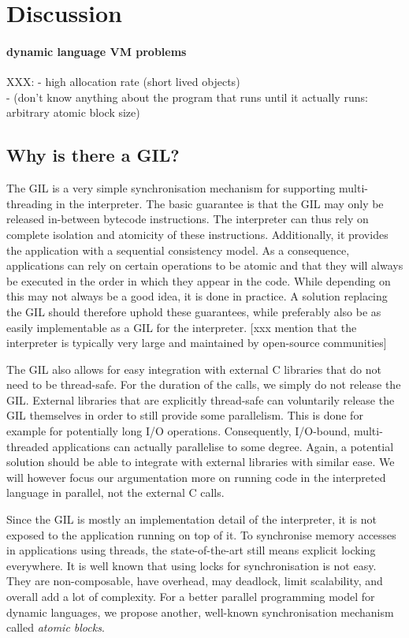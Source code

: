 \documentclass{sigplanconf}
\begin{document}
\section{Discussion}

\paragraph{dynamic language VM problems}
XXX:
- high allocation rate (short lived objects)\\
- (don't know anything about the program that runs until it actually runs: arbitrary atomic block size)


\subsection{Why is there a GIL?}
The GIL is a very simple synchronisation mechanism for supporting
multi-threading in the interpreter. The basic guarantee is that the
GIL may only be released in-between bytecode instructions. The
interpreter can thus rely on complete isolation and atomicity of these
instructions. Additionally, it provides the application with a
sequential consistency model. As a consequence, applications can rely
on certain operations to be atomic and that they will always be
executed in the order in which they appear in the code. While
depending on this may not always be a good idea, it is done in
practice. A solution replacing the GIL should therefore uphold these
guarantees, while preferably also be as easily implementable as a GIL
for the interpreter.
[xxx mention that the interpreter is typically very large and maintained
by open-source communities]

The GIL also allows for easy integration with external C libraries that
do not need to be thread-safe. For the duration of the calls, we
simply do not release the GIL. External libraries that are explicitly
thread-safe can voluntarily release the GIL themselves in order to
still provide some parallelism. This is done for example for
potentially long I/O operations. Consequently, I/O-bound,
multi-threaded applications can actually parallelise to some
degree. Again, a potential solution should be able to integrate with
external libraries with similar ease. We will however focus our
argumentation more on running code in the interpreted language in
parallel, not the external C calls.

Since the GIL is mostly an implementation detail of the interpreter,
it is not exposed to the application running on top of it. To
synchronise memory accesses in applications using threads, the
state-of-the-art still means explicit locking everywhere. It is well
known that using locks for synchronisation is not easy.  They are
non-composable, have overhead, may deadlock, limit scalability, and
overall add a lot of complexity. For a better parallel programming
model for dynamic languages, we propose another, well-known
synchronisation mechanism called \emph{atomic blocks}.
\end{document}
